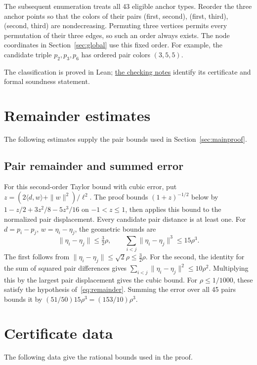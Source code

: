\documentclass[11pt]{article}
\begin{document}
\begin{appendices}
The subsequent enumeration treats all 43 eligible anchor types.
Reorder the three anchor points so that the colors of their pairs
(first, second), (first, third), (second, third) are nondecreasing.
Permuting three vertices permits every permutation of their three edges,
so such an order always exists. The node coordinates in Section~\ref{sec:global} use this
fixed order. For example, the candidate triple $p_2,p_3,p_6$ has ordered
pair colors $(3,5,5)$.

The classification is proved in Lean; \href{https://github.com/6/clank-lab/blob/thomson-10-v6/results/thomson-10/checks/README.md}{the checking notes} identify its
certificate and formal soundness statement.

\section{Remainder estimates}\label{app:localdetails}
The following estimates supply the pair bounds used in Section~\ref{sec:mainproof}.
\subsection{Pair remainder and summed error}
For this second-order Taylor bound with cubic error, put
$z=(2\langle d,w\rangle+\|w\|^2)/\ell^2$.
The proof bounds $(1+z)^{-1/2}$ below by
$1-z/2+3z^2/8-5z^3/16$ on $-1<z\leq1$, then applies this bound to the
normalized pair displacement.
Every candidate pair distance is at least one. For $d=p_i-p_j$,
$w=\eta_i-\eta_j$, the geometric bounds are
\[
 \|\eta_i-\eta_j\|\leq\tfrac32\rho,\qquad
 \sum_{i<j}\|\eta_i-\eta_j\|^3\leq15\rho^3.
\]
The first follows from $\|\eta_i-\eta_j\|\leq\sqrt2\rho\leq
\tfrac32\rho$. For the second, the identity for the sum of squared
pair differences gives $\sum_{i<j}\|\eta_i-\eta_j\|^2\leq10\rho^2$.
Multiplying this by the largest pair displacement gives the cubic bound.
For $\rho\leq1/1000$, these satisfy the hypothesis of~\eqref{eq:remainder}.
Summing the error over all 45 pairs bounds it by
$(51/50)15\rho^3=(153/10)\rho^3$.

\section{Certificate data}\label{app:formal}
The following data give the rational bounds used in the proof.


\end{appendices}
\end{document}
